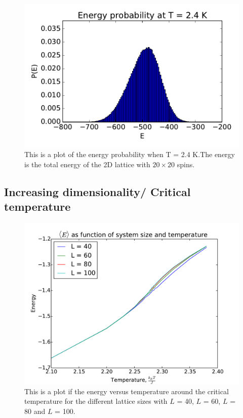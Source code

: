 \begin{figure}[H]
\includegraphics[width=\linewidth]{../results/4d/d_T_2_4probability}\caption{This is a plot of the energy probability when T = 2.4 K.The energy is the total energy of the 2D lattice with $20\times 20$ spins.}\label{fig:probability_T_2.4}
\end{figure}

\subsection{Increasing dimensionality/ Critical temperature}

\begin{figure}[H]
\includegraphics[width=\linewidth]{../results/4e/4e_energy}\caption{This is a plot if the energy versus temperature around the critical temperature for the different lattice sizes with $L$ = 40, $L$ = 60, $L$ = 80 and $L$ = 100.}\label{fig:4e_energy}
\end{figure}

